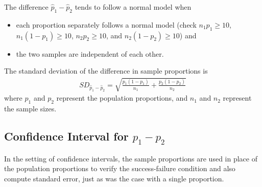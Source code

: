 \begin{termBox}{
The difference $\hat{p}_1 - \hat{p}_2$ tends to follow a normal model when
\begin{itemize}
\setlength{\itemsep}{0mm}
\item each proportion separately follows a normal model (check $n_1p_1 \geq 10$, $n_1(1-p_1) \geq 10$, $n_2p_2 \geq 10$, and $n_2(1-p_2) \geq 10$) and
\item the two samples are independent of each other.
\end{itemize}
The standard deviation of the difference in sample proportions is
\begin{eqnarray}
SD_{\hat{p}_1 - \hat{p}_2}
	= \sqrt{\frac{p_1(1-p_1)}{n_1} + \frac{p_2(1-p_2)}{n_2}}
\label{sdForDiffOfProp}
\end{eqnarray}
where $p_1$ and $p_2$ represent the population proportions, and $n_1$ and $n_2$ represent the sample sizes.}
\end{termBox}


\subsection{Confidence Interval for $p_1 -p_2$}

In the setting of confidence intervals, the sample proportions are used in place of the population proportions to verify the success-failure condition and also compute standard error, just as was the case with a single proportion.

